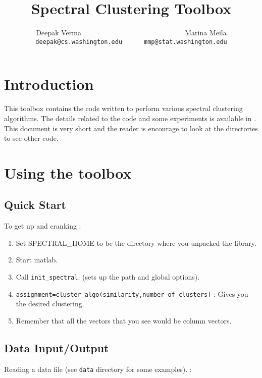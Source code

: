 \documentclass[10pt]{article}
\begin{document}
\title{Spectral Clustering Toolbox}
\author{Deepak Verma ~~~~~~~~~~~~~~~~~~~~~~~~~~~~ Marina Meila \\\texttt{deepak@cs.washington.edu~~~~~~mmp@stat.washington.edu}}
\maketitle


\section{Introduction}
\label{sec:intro}

This toolbox contains the code written to perform various spectral
clustering algorithms. The details related to the code and some
experiments is available in \cite{VM03}. This document is very short and the
reader is encourage to look at the directories to see other code.  

\section{Using the toolbox}
\subsection{Quick Start}
\label{sec:quick}


To get up and cranking : 

\begin{enumerate}
\item  Set \textsc{SPECTRAL\_HOME} to be the directory where you unpacked the
  library.  
\item  Start matlab.  
\item  Call \texttt{init\_spectral}. (sets up the path
  and global options).  
\item 
  \texttt{assignment=cluster\_algo(similarity,number\_of\_clusters)} :
  Gives you the  desired clustering.     
\item  Remember that all the vectors that you see
  would be column vectors.
\end{enumerate}



\subsection{Data Input/Output}
\label{sec:dataio}


Reading a data file (see \texttt{data} directory for some examples). : 
\end{document}
